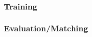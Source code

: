 \documentclass[a4paper, oneside]{csthesis}
\begin{document}

\subsubsection{Training}


\subsubsection{Evaluation/Matching}


\end{document}
